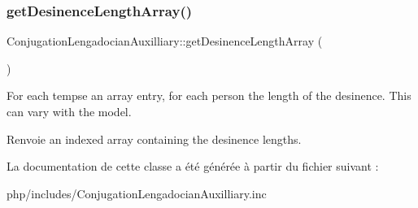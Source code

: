 \subsubsection{\texorpdfstring{get\+Desinence\+Length\+Array()}{getDesinenceLengthArray()}}
{\footnotesize\ttfamily Conjugation\+Lengadocian\+Auxilliary\+::get\+Desinence\+Length\+Array (\begin{DoxyParamCaption}{ }\end{DoxyParamCaption})\hspace{0.3cm}{\ttfamily [protected]}}



For each tempse an array entry, for each person the length of the desinence. This can vary with the model. 

\begin{DoxyReturn}{Renvoie}
an indexed array containing the desinence lengths. 
\end{DoxyReturn}


La documentation de cette classe a été générée à partir du fichier suivant \+:\begin{DoxyCompactItemize}
\item 
php/includes/Conjugation\+Lengadocian\+Auxilliary.\+inc\end{DoxyCompactItemize}
